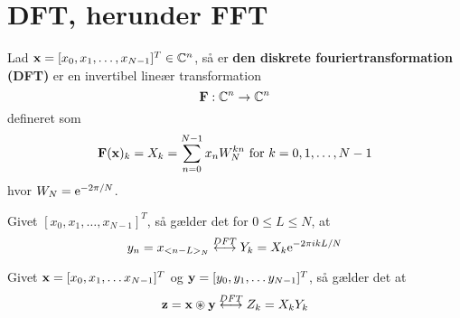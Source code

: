 \chapter{DFT, herunder FFT}
\begin{definition}
  Lad $\mathbf{x} = [x_{0}, x_{1}, \ldots, x_{N - 1}]^{T} \in \mathbb{C}^{n}$, så er \textbf{den diskrete fouriertransformation (DFT)} er en invertibel lineær transformation
  \begin{equation*}
    \mathbf{F}: \mathbb{C}^{n} \to \mathbb{C}^{n}
  \end{equation*}
  defineret som
  \begin{equation*}
    \mathbf{F}(\mathbf{x})_{k} = X_{k} = \sum_{n=0}^{N-1} x_{n} W_{N}^{kn} \text{ for } k = 0, 1, \ldots, N - 1
  \end{equation*}
  hvor $W_{N} = \mathrm{e}^{- 2\pi / N}$.
\end{definition}

%

\begin{lemma}
  Givet $[x_{0}, x_{1}, \ldots, x_{N - 1}]^{T}$, så gælder det for $0 \leq L \leq N$, at
  \begin{equation*}
    y_{n} = x_{<n-L>_{N}} \stackrel{DFT}\longleftrightarrow Y_{k} = X_{k}\mathrm{e}^{-2\pi i kL / N}
  \end{equation*}
\end{lemma}

\begin{theorem}
  Givet $\mathbf{x}=[x_{0}, x_{1}, \ldots x_{N - 1}]^{T}$ og $\mathbf{y} = [y_{0}, y_{1}, \ldots y_{N - 1}]^{T}$, så gælder det at
  \begin{equation*}
    \mathbf{z} = \mathbf{x} \circledast \mathbf{y} \stackrel{DFT}\longleftrightarrow Z_{k} = X_{k}Y_{k}
  \end{equation*}
\end{theorem}

